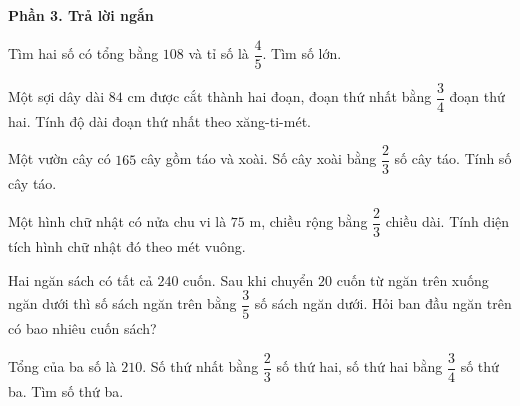 \textbf{Phần 3. Trả lời ngắn}

\begin{ex} %
Tìm hai số có tổng bằng $108$ và tỉ số là $\dfrac{4}{5}$. Tìm số lớn.
\end{ex}

\begin{ex} %
Một sợi dây dài $84\text{ cm}$ được cắt thành hai đoạn, đoạn thứ nhất bằng $\dfrac{3}{4}$ đoạn thứ hai. Tính độ dài đoạn thứ nhất theo xăng-ti-mét.
\end{ex}

\begin{ex} %
Một vườn cây có $165$ cây gồm táo và xoài. Số cây xoài bằng $\dfrac{2}{3}$ số cây táo. Tính số cây táo.
\end{ex}

\begin{ex} %
Một hình chữ nhật có nửa chu vi là $75\text{ m}$, chiều rộng bằng $\dfrac{2}{3}$ chiều dài. Tính diện tích hình chữ nhật đó theo mét vuông.
\end{ex}

\begin{ex} %
Hai ngăn sách có tất cả $240$ cuốn. Sau khi chuyển $20$ cuốn từ ngăn trên xuống ngăn dưới thì số sách ngăn trên bằng $\dfrac{3}{5}$ số sách ngăn dưới. Hỏi ban đầu ngăn trên có bao nhiêu cuốn sách?
\end{ex}

\begin{ex} %
Tổng của ba số là $210$. Số thứ nhất bằng $\dfrac{2}{3}$ số thứ hai, số thứ hai bằng $\dfrac{3}{4}$ số thứ ba. Tìm số thứ ba.
\end{ex}
